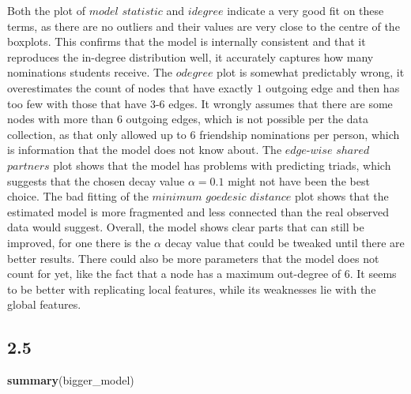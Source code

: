 \documentclass[
]{article}
\newenvironment{Shaded}{\begin{snugshade}}{\end{snugshade}}
\newcommand{\FunctionTok}[1]{\textcolor[rgb]{0.13,0.29,0.53}{\textbf{#1}}}
\newcommand{\NormalTok}[1]{#1}
\begin{document}
Both the plot of \(model\) \(statistic\) and \(idegree\) indicate a very
good fit on these terms, as there are no outliers and their values are
very close to the centre of the boxplots. This confirms that the model
is internally consistent and that it reproduces the in-degree
distribution well, it accurately captures how many nominations students
receive. The \(odegree\) plot is somewhat predictably wrong, it
overestimates the count of nodes that have exactly \(1\) outgoing edge
and then has too few with those that have \(3\)-\(6\) edges. It wrongly
assumes that there are some nodes with more than \(6\) outgoing edges,
which is not possible per the data collection, as that only allowed up
to \(6\) friendship nominations per person, which is information that
the model does not know about. The \(edge\)-\(wise\) \(shared\)
\(partners\) plot shows that the model has problems with predicting
triads, which suggests that the chosen decay value \(\alpha = 0.1\)
might not have been the best choice. The bad fitting of the \(minimum\)
\(goedesic\) \(distance\) plot shows that the estimated model is more
fragmented and less connected than the real observed data would suggest.
Overall, the model shows clear parts that can still be improved, for one
there is the \(\alpha\) decay value that could be tweaked until there
are better results. There could also be more parameters that the model
does not count for yet, like the fact that a node has a maximum
out-degree of 6. It seems to be better with replicating local features,
while its weaknesses lie with the global features.

\subsection{2.5}\label{section-6}

\begin{Shaded}
\begin{Highlighting}[]
\FunctionTok{summary}\NormalTok{(bigger\_model)}
\end{Highlighting}
\end{Shaded}
\end{document}
